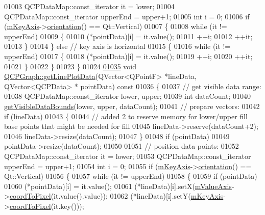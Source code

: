 \begin{DoxyCode}
01003   QCPDataMap::const\_iterator it = lower;
01004   QCPDataMap::const\_iterator upperEnd = upper+1;
01005   \textcolor{keywordtype}{int} i = 0;
01006   \textcolor{keywordflow}{if} (\hyperlink{a00024_a692421b963472fa6e16156a74ba96832}{mKeyAxis}->\hyperlink{a00025_a57483f2f60145ddc9e63f3af53959265}{orientation}() == Qt::Vertical)
01007   \{
01008     \textcolor{keywordflow}{while} (it != upperEnd)
01009     \{
01010       (*pointData)[i] = it.value();
01011       ++i;
01012       ++it;
01013     \}
01014   \} \textcolor{keywordflow}{else} \textcolor{comment}{// key axis is horizontal}
01015   \{
01016     \textcolor{keywordflow}{while} (it != upperEnd)
01017     \{
01018       (*pointData)[i] = it.value();
01019       ++i;
01020       ++it;
01021     \}
01022   \}
01023 \}
01024 
\hypertarget{a00115_source_l01035}{}\hyperlink{a00031_ac76804eb33446181f3e4f708b7639a75}{01035} \textcolor{keywordtype}{void} \hyperlink{a00031_ac76804eb33446181f3e4f708b7639a75}{QCPGraph::getLinePlotData}(QVector<QPointF> *lineData, QVector<QCPData> *
      pointData)\textcolor{keyword}{ const}
01036 \textcolor{keyword}{}\{
01037   \textcolor{comment}{// get visible data range:}
01038   QCPDataMap::const\_iterator lower, upper;
01039   \textcolor{keywordtype}{int} dataCount;
01040   \hyperlink{a00031_a8963c90087cf53b889b29dd59aa41aad}{getVisibleDataBounds}(lower, upper, dataCount);
01041   \textcolor{comment}{// prepare vectors:}
01042   \textcolor{keywordflow}{if} (lineData)
01043   \{ 
01044     \textcolor{comment}{// added 2 to reserve memory for lower/upper fill base points that might be needed for fill}
01045     lineData->reserve(dataCount+2);
01046     lineData->resize(dataCount);
01047   \}
01048   \textcolor{keywordflow}{if} (pointData)
01049     pointData->resize(dataCount);
01050 
01051   \textcolor{comment}{// position data points:}
01052   QCPDataMap::const\_iterator it = lower;
01053   QCPDataMap::const\_iterator upperEnd = upper+1;
01054   \textcolor{keywordtype}{int} i = 0;
01055   \textcolor{keywordflow}{if} (\hyperlink{a00024_a692421b963472fa6e16156a74ba96832}{mKeyAxis}->\hyperlink{a00025_a57483f2f60145ddc9e63f3af53959265}{orientation}() == Qt::Vertical)
01056   \{
01057     \textcolor{keywordflow}{while} (it != upperEnd)
01058     \{
01059       \textcolor{keywordflow}{if} (pointData)
01060         (*pointData)[i] = it.value();
01061       (*lineData)[i].setX(\hyperlink{a00024_acfc46d619ab9598be33b64146da45822}{mValueAxis}->\hyperlink{a00025_a985ae693b842fb0422b4390fe36d299a}{coordToPixel}(it.value().value));
01062       (*lineData)[i].setY(\hyperlink{a00024_a692421b963472fa6e16156a74ba96832}{mKeyAxis}->\hyperlink{a00025_a985ae693b842fb0422b4390fe36d299a}{coordToPixel}(it.key()));

\end{DoxyCode}
